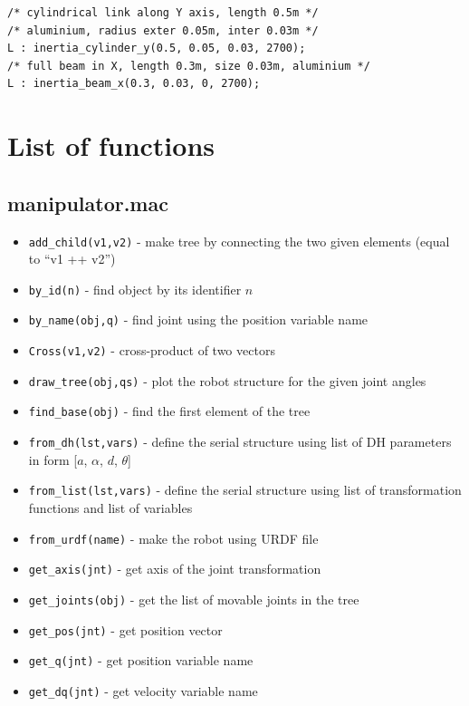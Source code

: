 \documentclass{article}
\begin{document}
\begin{verbatim}
/* cylindrical link along Y axis, length 0.5m */
/* aluminium, radius exter 0.05m, inter 0.03m */
L : inertia_cylinder_y(0.5, 0.05, 0.03, 2700);
/* full beam in X, length 0.3m, size 0.03m, aluminium */
L : inertia_beam_x(0.3, 0.03, 0, 2700);
\end{verbatim}

\section{List of functions} 

\subsection{manipulator.mac}

\begin{itemize}
    \item \texttt{add\_child(v1,v2)} - make tree by connecting the two given elements (equal to ``v1 ++ v2'')
    \item \texttt{by\_id(n)} - find object by its identifier $n$
    \item \texttt{by\_name(obj,q)} - find joint using the position variable name
    \item \texttt{Cross(v1,v2)} - cross-product of two vectors
    \item \texttt{draw\_tree(obj,qs)} - plot the robot structure for the given joint angles 
    \item \texttt{find\_base(obj)} - find the first element of the tree
    \item \texttt{from\_dh(lst,vars)} - define the serial structure using list of DH parameters in form [$a$, $\alpha$, $d$, $\theta$]
    \item \texttt{from\_list(lst,vars)} - define the serial structure using list of transformation functions and list of variables
    \item \texttt{from\_urdf(name)} - make the robot using URDF file
    \item \texttt{get\_axis(jnt)} - get axis of the joint transformation
    \item \texttt{get\_joints(obj)} - get the list of movable joints in the tree
    \item \texttt{get\_pos(jnt)} - get position vector
    \item \texttt{get\_q(jnt)} - get position variable name 
    \item \texttt{get\_dq(jnt)} - get velocity variable name 

\end{itemize}
\end{document}
